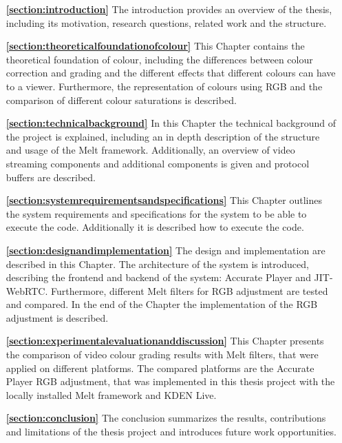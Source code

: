\documentclass[../MasterThesis.tex]{subfiles}
\begin{document}
	
	\begin{itemize}
		
		\item[\textbf{\ref{section:introduction}}] The introduction provides an overview of the thesis, including its motivation, research questions, related work and the structure.
		
		\item[\textbf{\ref{section:theoreticalfoundationofcolour}}] This Chapter contains the theoretical foundation of colour, including the differences between colour correction and grading and the  different effects that different colours can have to a viewer. Furthermore, the representation of colours using RGB and the comparison of different colour saturations is described.
		
		\item[\textbf{\ref{section:technicalbackground}}] In this Chapter the technical background of the project is explained, including an in depth description of the structure and usage of the Melt framework. Additionally, an overview of video streaming components and additional components is given and protocol buffers are described.
		
		\item[\textbf{\ref{section:systemrequirementsandspecifications}}] This Chapter outlines the system requirements and specifications for the system to be able to execute the code. Additionally it is described how to execute the code.
		
		\item[\textbf{\ref{section:designandimplementation}}] The design and implementation are described in this Chapter. The architecture of the system is introduced, describing the frontend and backend of the system: Accurate Player and JIT-WebRTC. Furthermore, different Melt filters for RGB adjustment are tested and compared. In the end of the Chapter the implementation of the RGB adjustment is described.
		
		\item[\textbf{\ref{section:experimentalevaluationanddiscussion}}] This Chapter presents the comparison of video colour grading results with Melt filters, that were applied on different platforms. The compared platforms are the Accurate Player RGB adjustment, that was implemented in this thesis project with the locally installed Melt framework and KDEN Live.
		
		\item[\textbf{\ref{section:conclusion}}] The conclusion summarizes the results, contributions and limitations of the thesis project and introduces future work opportunities.
		
	\end{itemize}

	
	
	

	
	

	
	
	
\end{document}
